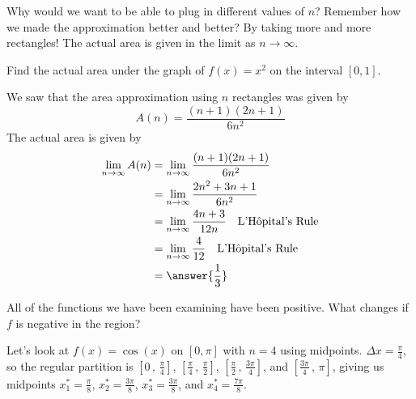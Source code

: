 \documentclass{ximera}
\begin{document}
Why would we want to be able to plug in different values of $n$?  Remember how we made the approximation better and better?  By taking
more and more rectangles!  The actual area is given in the limit as $n\to \infty$.

\begin{example}
	Find the actual area under the graph of $f(x)=x^2$ on the interval $[0,1]$.
	\begin{explanation}
		We saw that the area approximation using $n$ rectangles was given by
		\[ A(n) = \frac{(n+1)(2n+1)}{6n^2} \]
		The actual area is given by
		\begin{align*}
			\lim_{n\to\infty} A(n) &= \lim_{n\to\infty} \frac{(n+1)(2n+1)}{6n^2}\\
				&= \lim_{n\to\infty} \frac{2n^2+3n+1}{6n^2} \\
				&= \lim_{n\to\infty} \frac{4n+3}{12n} \quad \text{L'H\^{o}pital's Rule}\\
				&= \lim_{n\to\infty} \frac{4}{12} \quad \text{L'H\^{o}pital's Rule}\\
				&= \answer{\frac{1}{3}}
		\end{align*}
	\end{explanation}
\end{example}

All of the functions we have been examining have been positive.  What changes if $f$ is negative in the region?

Let's look at $f(x) = \cos(x)$ on $[0, \pi]$ with $n=4$ using midpoints.
$\Delta x = \frac{\pi}{4}$, so the regular partition is $\left[ 0 \, , \, \frac{\pi}{4} \right]$, $\left[ \frac{\pi}{4} \, , \, \frac{\pi}{2} \right]$, $\left[ \frac{\pi}{2} \, , \, \frac{3\pi}{4} \right]$, and 
$\left[ \frac{3\pi}{4} \, , \, \pi \right]$, giving us midpoints $x_1^* = \frac{\pi}{8}$, $x_2^* = \frac{3\pi}{8}$, $x_3^* = \frac{3\pi}{8}$, and $x_4^*=\frac{7\pi}{8}$.
\begin{image}
\end{image}
\end{document}

